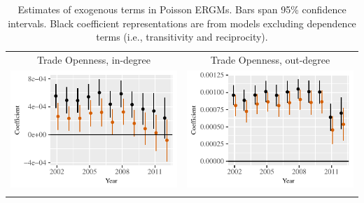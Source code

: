 \documentclass[reqno,onecolumn,letterpaper,12pt]{article}
\begin{document}
\begin{longtable}[!h]{c@{\hskip -.4cm}c}
Trade Openness, in-degree &
Trade Openness,  out-degree\\
\includegraphics[height=.2\textheight, clip=true, trim=0cm .5cm 0cm .1cm]{draft_figures/rl_plots/TradeO_in.pdf}  &
\includegraphics[height=.2\textheight, clip=true, trim=.5cm .5cm 0cm .1cm]{draft_figures/rl_plots/TradeO_out.pdf}   \\

\caption{\label{fig:effectPlots1} Estimates of exogenous terms in Poisson ERGMs. Bars span 95\% confidence intervals. Black coefficient representations are from models excluding dependence terms (i.e., transitivity and reciprocity).}

\end{longtable}
\end{document}
